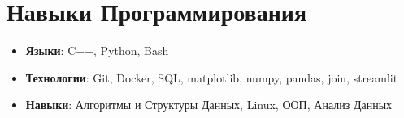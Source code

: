 \documentclass[16pt,a4paper]{article}
\newcommand{\resumeSubHeadingListStart}{\begin{itemize}[leftmargin=*]}
\newcommand{\resumeSubHeadingListEnd}{\end{itemize}}
\begin{document}
\section{Навыки Программирования}
 \resumeSubHeadingListStart
   \item{
     \textbf{Языки}{: C++, Python, Bash}
   }\vspace{0pt}
   \item{
     \textbf{Технологии}{: Git, Docker, SQL, matplotlib, numpy, pandas, join, streamlit}
   }
   \vspace{0pt}
   \item{
     \textbf{Навыки}{: Алгоритмы и Структуры Данных, Linux, ООП, Анализ Данных}
   }
 \resumeSubHeadingListEnd

\end{document}
